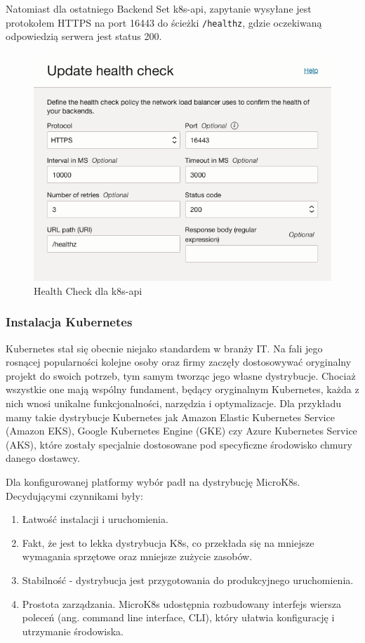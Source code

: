 Natomiast dla ostatniego Backend Set k8s-api, zapytanie wysyłane jest protokołem HTTPS na port 16443 do ścieżki \texttt{/healthz}, gdzie oczekiwaną odpowiedzią serwera jest status 200.
\begin{figure}[H]
    \centering
    \includegraphics[width=\textwidth]{img/oci-network-load-balancer-k8s-api-health-check}
    \caption{Health Check dla k8s-api}
    \label{fig:oci-network-load-balancer-k8s-api-health-check}
\end{figure}

\subsubsection{Instalacja Kubernetes}

Kubernetes stał się obecnie niejako standardem w branży IT\@.
Na fali jego rosnącej popularności kolejne osoby oraz firmy zaczęły dostosowywać oryginalny projekt do swoich potrzeb, tym samym tworząc jego własne dystrybucje.
Chociaż wszystkie one mają wspólny fundament, będący oryginalnym Kubernetes, każda z nich wnosi unikalne funkcjonalności, narzędzia i optymalizacje.
Dla przykładu mamy takie dystrybucje Kubernetes jak Amazon Elastic Kubernetes Service (Amazon EKS), Google Kubernetes Engine (GKE) czy Azure Kubernetes Service (AKS), które zostały specjalnie dostosowane pod specyficzne środowisko chmury danego dostawcy.

\begin{samepage}
    Dla konfigurowanej platformy wybór padł na dystrybucję MicroK8s.
    Decydującymi czynnikami były:
    \begin{enumerate}
        \item Łatwość instalacji i uruchomienia.
        \item Fakt, że jest to lekka dystrybucja K8s, co przekłada się na mniejsze wymagania sprzętowe oraz mniejsze zużycie zasobów.
        \item Stabilność - dystrybucja jest przygotowania do produkcyjnego uruchomienia.
        \item Prostota zarządzania. MicroK8s udostępnia rozbudowany interfejs wiersza poleceń (ang. command line interface, CLI), który ułatwia konfigurację i utrzymanie środowiska.
    \end{enumerate}
\end{samepage}


